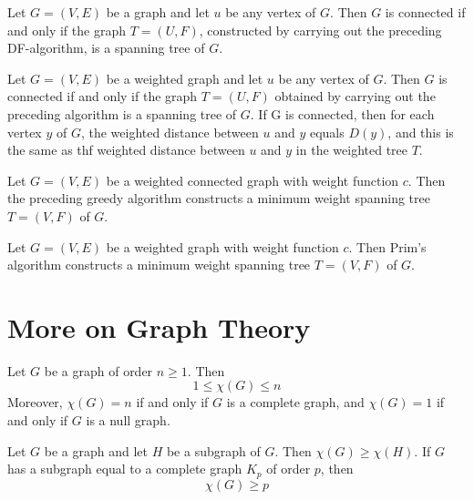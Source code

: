 \begin{theorem}
  \label{thm:11.7.3}
  Let $G = (V, E)$ be a graph and let $u$ be any vertex of $G$. Then $G$ is connected if and only if
  the graph $T = (U, F)$, constructed by carrying out the preceding DF-algorithm, is a spanning tree
  of $G$.
\end{theorem}

\begin{theorem}
  \label{thm:11.7.4}
  Let $G = (V, E)$ be a weighted graph and let $u$ be any vertex of $G$. Then $G$ is connected if 
  and only if the graph $T = (U, F)$ obtained by carrying out the preceding algorithm is a spanning
  tree of $G$. If G is connected, then for each vertex $y$ of $G$, the weighted distance between $u$
  and $y$ equals $D(y)$, and this is the same as thf weighted distance between $u$ and $y$ in the 
  weighted tree $T$.
\end{theorem}

\begin{theorem}
  \label{thm:11.7.5}
  Let $G = (V, E)$ be a weighted connected graph with weight function $c$. Then the preceding greedy
  algorithm constructs a minimum weight spanning tree $T = (V, F)$ of $G$.
\end{theorem}

\begin{theorem}
  \label{thm:11.7.6}
  Let $G = (V, E)$ be a weighted graph with weight function $c$. Then Prim's algorithm constructs a 
  minimum weight spanning tree $T = (V, F)$ of $G$.
\end{theorem}


\chapter{More on Graph Theory}

\begin{theorem}
  \label{thm:12.1.1}
  Let $G$ be a graph of order $n \geq 1$. Then
  $$
  1 \leq \chi(G) \leq n
  $$
  Moreover, $\chi(G)=n$ if and only if $G$ is a complete graph, and $\chi(G)=1$ if and only if $G$ 
  is a null graph.
\end{theorem}

\begin{corollary}
  \label{cor:12.1.2}
  Let $G$ be a graph and let $H$ be a subgraph of $G$. Then $\chi(G) \geq \chi(H)$. If $G$ has a 
  subgraph equal to a complete graph $K_p$ of order $p$, then
  $$
  \chi(G) \geq p
  $$
\end{corollary}

